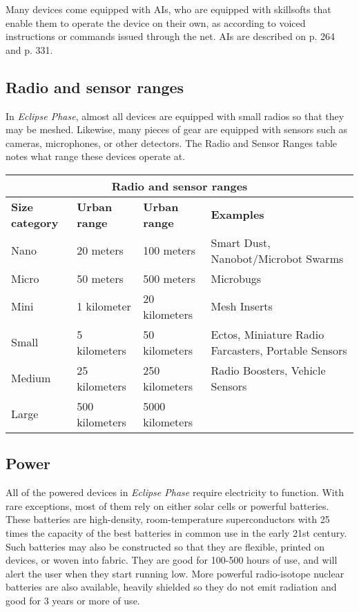 Many devices come equipped with AIs, who are equipped with skillsofts that enable them to operate the device on their own, as according to voiced instructions or commands issued through the net. AIs are described on p. 264 and p. 331. 



\subsection{Radio and sensor ranges} \label{sec:radio-sensor-ranges} 

In \emph{Eclipse Phase}, almost all devices are equipped with small radios so that they may be meshed. Likewise, many pieces of gear are equipped with sensors such as cameras, microphones, or other detectors. The Radio and Sensor Ranges table notes what range these devices operate at. 

\begin{table} \begin{tabularx}{\textwidth}{|l|l|l|X|} \hline

\multicolumn{4}{|c|}{\textbf{Radio and sensor ranges}}	\\ \hline

\textbf{Size category}	&\textbf{Urban range}	&\textbf{Urban range}	&\textbf{Examples} \\ \hline

Nano &20 meters &100 meters	&Smart Dust, Nanobot/Microbot Swarms \\ Micro	&50 meters	&500 meters	&Microbugs \\ Mini	&1 kilometer	&20 kilometers	&Mesh Inserts \\ Small	&5 kilometers	&50 kilometers	&Ectos, Miniature Radio Farcasters, Portable Sensors \\ Medium	&25 kilometers	&250 kilometers	&Radio Boosters, Vehicle Sensors \\ Large	&500 kilometers	&5000 kilometers	&\\ \hline

\end{tabularx} \label{tab:radio-sensor-ranges} \end{table} 



\subsection{Power} \label{sec:power} 

All of the powered devices in \emph{Eclipse Phase} require electricity to function. With rare exceptions, most of them rely on either solar cells or powerful batteries. These batteries are high-density, room-temperature superconductors with 25 times the capacity of the best batteries in common use in the early 21st century. Such batteries may also be constructed so that they are flexible, printed on devices, or woven into fabric. They are good for 100-500 hours of use, and will alert the user when they start running low. More powerful radio-isotope nuclear batteries are also available, heavily shielded so they do not emit radiation and good for 3 years or more of use. 

